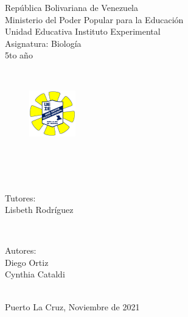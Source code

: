 \begin{titlepage}
\newcommand{\HRule}{\rule{\linewidth}{0.5mm}}
\begin{center}
\large República Bolivariana de Venezuela\\[0.1cm] 
\large Ministerio del Poder Popular para la Educación\\[0.1cm]
\large Unidad Educativa Instituto Experimental\\[0.1cm] 
\large Asignatura: Biología\\[0.1cm] 
\large 5to año\\[0.1cm] 
\end{center}
\center 
\quad\\[0.1cm]
\begin{figure}[h]
\centering
\includegraphics[width=2cm]{title/logo.png}
\end{figure}
\quad\\[0.1cm]
\makeatletter
{ \huge \bfseries \@title}\\[0.5cm]
\quad\\[0.9cm]

\begin{minipage}{0.4\textwidth}
\begin{flushleft} \large
\textup{Tutores:}\\
\textup{Lisbeth Rodríguez}
\end{flushleft}
\end{minipage}
~
\begin{minipage}{0.4\textwidth}
\begin{flushright} \large
\textup{Autores:} \\
Diego Ortiz\\
Cynthia Cataldi
\end{flushright}
\end{minipage}\\[3cm]
\makeatother
\mbox{}
\vfill
\large Puerto La Cruz, Noviembre de 2021
\end{titlepage}

